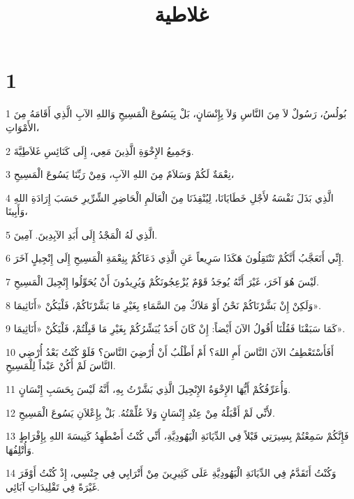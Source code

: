 

\title{غلاطية}


\chapter{1}

\par 1 بُولُسُ، رَسُولٌ لاَ مِنَ النَّاسِ وَلاَ بِإِنْسَانٍ، بَلْ بِيَسُوعَ الْمَسِيحِ وَاللهِ الآبِ الَّذِي أَقَامَهُ مِنَ الأَمْوَاتِ،
\par 2 وَجَمِيعُ الإِخْوَةِ الَّذِينَ مَعِي، إِلَى كَنَائِسِ غَلاَطِيَّةَ.
\par 3 نِعْمَةٌ لَكُمْ وَسَلاَمٌ مِنَ اللهِ الآبِ، وَمِنْ رَبِّنَا يَسُوعَ الْمَسِيحِ،
\par 4 الَّذِي بَذَلَ نَفْسَهُ لأَجْلِ خَطَايَانَا، لِيُنْقِذَنَا مِنَ الْعَالَمِ الْحَاضِرِ الشِّرِّيرِ حَسَبَ إِرَادَةِ اللهِ وَأَبِينَا،
\par 5 الَّذِي لَهُ الْمَجْدُ إِلَى أَبَدِ الآبِدِينَ. آمِينَ.
\par 6 إِنِّي أَتَعَجَّبُ أَنَّكُمْ تَنْتَقِلُونَ هَكَذَا سَرِيعاً عَنِ الَّذِي دَعَاكُمْ بِنِعْمَةِ الْمَسِيحِ إِلَى إِنْجِيلٍ آخَرَ.
\par 7 لَيْسَ هُوَ آخَرَ، غَيْرَ أَنَّهُ يُوجَدُ قَوْمٌ يُزْعِجُونَكُمْ وَيُرِيدُونَ أَنْ يُحَوِّلُوا إِنْجِيلَ الْمَسِيحِ.
\par 8 وَلَكِنْ إِنْ بَشَّرْنَاكُمْ نَحْنُ أَوْ مَلاَكٌ مِنَ السَّمَاءِ بِغَيْرِ مَا بَشَّرْنَاكُمْ، فَلْيَكُنْ «أَنَاثِيمَا».
\par 9 كَمَا سَبَقْنَا فَقُلْنَا أَقُولُ الآنَ أَيْضاً: إِنْ كَانَ أَحَدٌ يُبَشِّرُكُمْ بِغَيْرِ مَا قَبِلْتُمْ، فَلْيَكُنْ «أَنَاثِيمَا».
\par 10 أَفَأَسْتَعْطِفُ الآنَ النَّاسَ أَمِ اللهَ؟ أَمْ أَطْلُبُ أَنْ أُرْضِيَ النَّاسَ؟ فَلَوْ كُنْتُ بَعْدُ أُرْضِي النَّاسَ لَمْ أَكُنْ عَبْداً لِلْمَسِيحِ.
\par 11 وَأُعَرِّفُكُمْ أَيُّهَا الإِخْوَةُ الإِنْجِيلَ الَّذِي بَشَّرْتُ بِهِ، أَنَّهُ لَيْسَ بِحَسَبِ إِنْسَانٍ.
\par 12 لأَنِّي لَمْ أَقْبَلْهُ مِنْ عِنْدِ إِنْسَانٍ وَلاَ عُلِّمْتُهُ. بَلْ بِإِعْلاَنِ يَسُوعَ الْمَسِيحِ.
\par 13 فَإِنَّكُمْ سَمِعْتُمْ بِسِيرَتِي قَبْلاً فِي الدِّيَانَةِ الْيَهُودِيَّةِ، أَنِّي كُنْتُ أَضْطَهِدُ كَنِيسَةَ اللهِ بِإِفْرَاطٍ وَأُتْلِفُهَا.
\par 14 وَكُنْتُ أَتَقَدَّمُ فِي الدِّيَانَةِ الْيَهُودِيَّةِ عَلَى كَثِيرِينَ مِنْ أَتْرَابِي فِي جِنْسِي، إِذْ كُنْتُ أَوْفَرَ غَيْرَةً فِي تَقْلِيدَاتِ آبَائِي.
